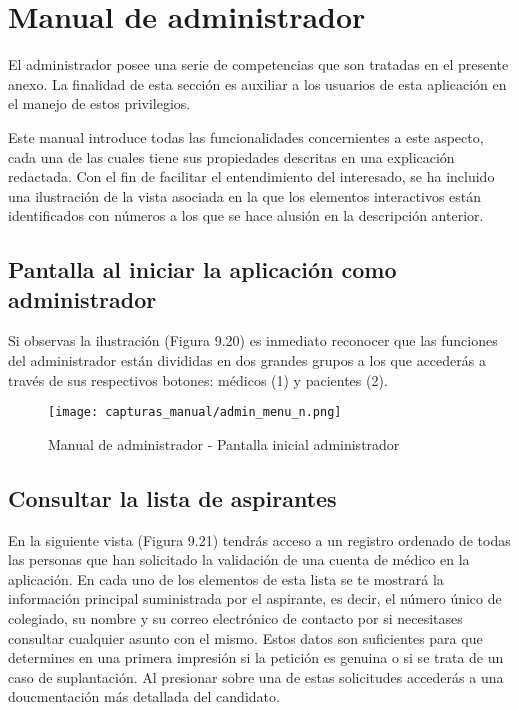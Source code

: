 \documentclass[11pt,spanish,
		listoftables,listoffigures]
		{tfgplantilla}
\begin{document}
\section{Manual de administrador}

El administrador posee una serie de competencias que son tratadas en el presente anexo. La finalidad de esta sección es auxiliar a los usuarios de esta aplicación en el manejo de estos privilegios. 

Este manual introduce todas las funcionalidades concernientes a este aspecto, cada una de las cuales tiene sus propiedades descritas en una explicación redactada. Con el fin de facilitar el entendimiento del interesado, se ha incluido una ilustración de la vista asociada en la que los elementos interactivos están identificados con números a los que se hace alusión en la descripción anterior.
 
\subsection {Pantalla al iniciar la aplicación como administrador}

Si observas la ilustración (Figura 9.20) es inmediato reconocer que las funciones del administrador están divididas en dos grandes grupos a los que accederás a través de sus respectivos botones: médicos (1) y pacientes (2).

\begin{figure}[H]
\centering
\texttt{[image: capturas\_manual/admin\_menu\_n.png]}
\caption{Manual de administrador - Pantalla inicial administrador}
\end{figure}

\newpage
\subsection {Consultar la lista de aspirantes}

En la siguiente vista (Figura 9.21) tendrás acceso a un registro ordenado de todas las personas que han solicitado la validación de una cuenta de médico en la aplicación. En cada uno de los elementos de esta lista se te mostrará la información principal suministrada por el aspirante, es decir, el número único de colegiado, su nombre y su correo electrónico de contacto por si necesitases consultar cualquier asunto con el mismo. Estos datos son suficientes para que determines en una primera impresión si la petición es genuina o si se trata de un  caso de suplantación. Al presionar sobre una de estas solicitudes accederás a una doucmentación más detallada del candidato.
\end{document}
